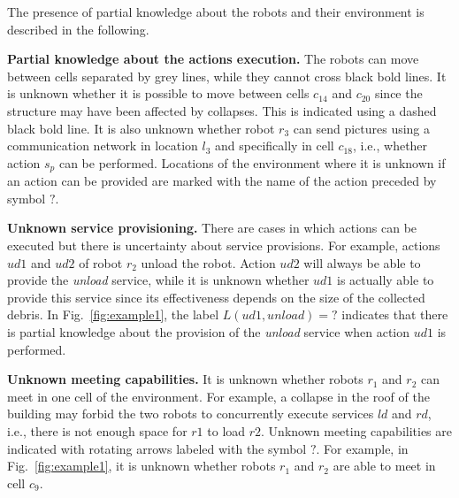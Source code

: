 The presence of partial knowledge about the robots and their environment is described in the following.

\textbf{Partial knowledge about the actions execution.} 
The robots can move between cells separated by grey lines, while they cannot cross black bold lines.
It is unknown whether it is possible to move between cells $c_{14}$ and $c_{20}$ since the structure may have been affected by collapses.
This is indicated using a dashed black bold line.
It is also unknown whether robot $r_3$ can send pictures using a communication network in location $l_3$ and specifically in cell $c_{18}$, i.e., whether action $s_p$ can be performed. 
Locations of the environment where it is unknown if an action can be provided are marked with the name of the action preceded by symbol $?$.

\textbf{Unknown service provisioning.} 
There are cases in which actions can be executed but there is uncertainty about service provisions.
For example, actions $ud1$ and $ud2$ of robot $r_2$ unload the robot.
Action $ud2$ will always be able to provide the \emph{unload} service, while it is unknown whether $ud1$ is actually able to provide this service since its effectiveness depends on the size of the collected debris. 
 In Fig.~\ref{fig:example1}, the label $L(ud1,unload)=?$ indicates that there is partial knowledge  about the provision of the \emph{unload} service when action $ud1$ is performed. 

\textbf{Unknown meeting capabilities.} 
It is  unknown whether robots $r_1$ and $r_2$ can meet in one cell of the environment. 
For example, a collapse in the roof of the building may forbid the two robots to concurrently execute services $ld$ and $rd$, i.e., there is not enough space for $r1$ to load $r2$. 
Unknown meeting capabilities are indicated with rotating arrows labeled with the symbol $?$.
For example,  in Fig.~\ref{fig:example1}, it is unknown whether robots $r_1$ and $r_2$ are able to meet in cell $c_{9}$.


